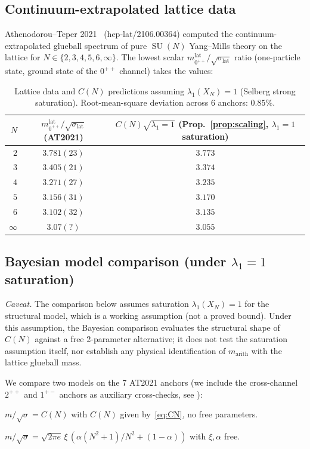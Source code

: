 \documentclass[11pt,a4paper]{article}
\theoremstyle{definition}
\DeclareMathOperator{\SU}{SU}
\newcommand{\marith}{m_{\mathrm{arith}}}
\begin{document}
\subsection{Continuum-extrapolated lattice data}

Athenodorou--Teper 2021~\cite{AT2021} (hep-lat/2106.00364) computed the
continuum-extrapolated glueball spectrum of pure $\SU(N)$ Yang--Mills theory
on the lattice for $N \in \{2,3,4,5,6,\infty\}$. The lowest scalar
$m_{0^{++}}^{\mathrm{lat}}/\sqrt{\sigma_{\mathrm{lat}}}$ ratio (one-particle
state, ground state of the $0^{++}$ channel) takes the values:

\begin{table}[h]\centering
\begin{tabular}{rcc}
\toprule
$N$ & $m_{0^{++}}^{\mathrm{lat}}/\sqrt{\sigma_{\mathrm{lat}}}$ (AT2021) & $C(N)\sqrt{\lambda_1=1}$ (Prop.~\ref{prop:scaling}, $\lambda_1=1$ saturation) \\
\midrule
$2$    & $3.781(23)$ & $3.773$ \\
$3$    & $3.405(21)$ & $3.374$ \\
$4$    & $3.271(27)$ & $3.235$ \\
$5$    & $3.156(31)$ & $3.170$ \\
$6$    & $3.102(32)$ & $3.135$ \\
$\infty$ & $3.07(?)$  & $3.055$ \\
\bottomrule
\end{tabular}
\caption{Lattice data and $C(N)$ predictions assuming $\lambda_1(X_N) = 1$
(Selberg strong saturation). Root-mean-square deviation across 6 anchors:
$0.85\%$.}
\label{tab:lattice}
\end{table}

\subsection{Bayesian model comparison (under $\lambda_1=1$ saturation)}

\emph{Caveat.} The comparison below assumes saturation $\lambda_1(X_N)=1$
for the structural model, which is a working assumption (not a proved
bound). Under this assumption, the Bayesian comparison evaluates the
structural shape of $C(N)$ against a free 2-parameter alternative; it does
not test the saturation assumption itself, nor establish any physical
identification of $\marith$ with the lattice glueball mass.

We compare two models on the 7 AT2021 anchors (we include the cross-channel
$2^{++}$ and $1^{+-}$ anchors as auxiliary cross-checks, see
\cite[supplementary]{Remondiere2026supp}):
\begin{description}[noitemsep]
\item[\textbf{Holy Grail (HG)} (parameter-free):] $m/\sqrt{\sigma} = C(N)$
  with $C(N)$ given by~\eqref{eq:CN}, no free parameters.
\item[\textbf{Free (F)} (two-parameter alternative):] $m/\sqrt{\sigma}
  = \sqrt{2\pi e}\,\xi\,(\alpha(N^2{+}1)/N^2 + (1-\alpha))$ with
  $\xi, \alpha$ free.
\end{description}
\end{document}
